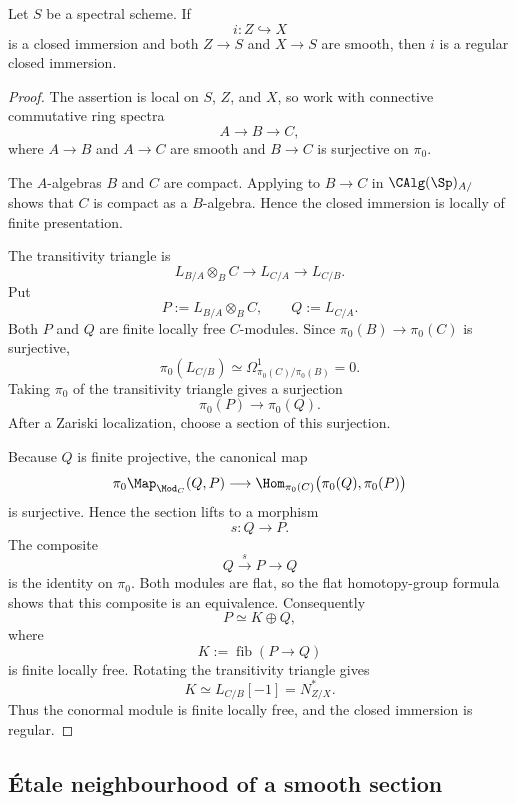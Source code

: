 \begin{theorem}
\label{thm:closed-between-smooth-regular}
Let $S$ be a spectral scheme. If
\[
    i
    \colon
    Z
    \hookrightarrow
    X
\]
is a closed immersion and both $Z\to S$ and $X\to S$ are smooth, then
$i$ is a regular closed immersion.
\end{theorem}

\begin{proof}
The assertion is local on $S$, $Z$, and $X$, so work with connective
commutative ring spectra
\[
    A
    \longrightarrow
    B
    \longrightarrow
    C,
\]
where $A\to B$ and $A\to C$ are smooth and $B\to C$ is surjective on
$\pi_0$.

The $A$-algebras $B$ and $C$ are compact. Applying
 to $B\to C$ in
$\CAlg(\Sp)_{A/}$ shows that $C$ is compact as a $B$-algebra. Hence the
closed immersion is locally of finite presentation.

The transitivity triangle is
\[
    L_{B/A}\otimes_BC
    \longrightarrow
    L_{C/A}
    \longrightarrow
    L_{C/B}.
\]
Put
\[
    P:=L_{B/A}\otimes_BC,
    \qquad
    Q:=L_{C/A}.
\]
Both $P$ and $Q$ are finite locally free $C$-modules. Since
$\pi_0(B)\to\pi_0(C)$ is surjective,
\[
    \pi_0(L_{C/B})
    \simeq
    \Omega^1_{\pi_0(C)/\pi_0(B)}
    =
    0.
\]
Taking $\pi_0$ of the transitivity triangle gives a surjection
\[
    \pi_0(P)
    \longrightarrow
    \pi_0(Q).
\]
After a Zariski localization, choose a section of this surjection.

Because $Q$ is finite projective, the canonical map
\[
    \pi_0\Map_{\Mod_C}(Q,P)
    \longrightarrow
    \Hom_{\pi_0(C)}
    \bigl(
        \pi_0(Q),
        \pi_0(P)
    \bigr)
\]
is surjective. Hence the section lifts to a morphism
\[
    s
    \colon
    Q
    \longrightarrow
    P.
\]
The composite
\[
    Q
    \xrightarrow{s}
    P
    \longrightarrow
    Q
\]
is the identity on $\pi_0$. Both modules are flat, so the flat
homotopy-group formula shows that this composite is an equivalence.
Consequently
\[
    P
    \simeq
    K\oplus Q,
\]
where
\[
    K
    :=
    \operatorname{fib}(P\to Q)
\]
is finite locally free. Rotating the transitivity triangle gives
\[
    K
    \simeq
    L_{C/B}[-1]
    =
    N^*_{Z/X}.
\]
Thus the conormal module is finite locally free, and the closed immersion
is regular.
\end{proof}

\subsection{\'{E}tale neighbourhood of a smooth section}

